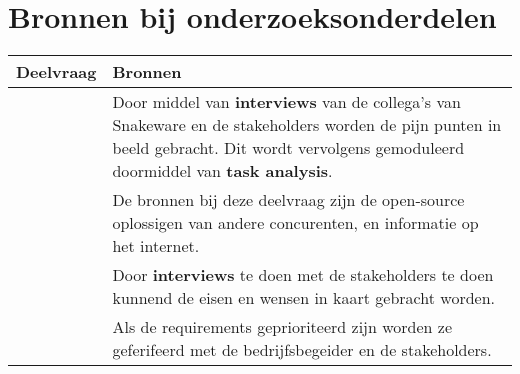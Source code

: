 \section{Bronnen bij onderzoeksonderdelen}
\begin{tabular}{ | p{5cm} | p{9cm} | }
	\hline
	\textbf{Deelvraag} & \textbf{Bronnen}                                                                                                                               \\
	\hline
	\SubquestionOne    & Door middel van \textbf{interviews} van de collega's van Snakeware en de stakeholders worden de pijn punten in beeld gebracht.
	Dit wordt vervolgens gemoduleerd doormiddel van \textbf{task analysis}. \\
	\hline
	\SubquestionTwo    & De bronnen bij deze deelvraag zijn de open-source oplossigen van andere concurenten, en informatie op het internet.                              \\
	\hline
	\SubquestionThree  & Door \textbf{interviews} te doen met de stakeholders te doen kunnend de eisen en wensen in kaart gebracht worden.                                                                                             \\
	\hline
	\SubquestionFour   & Als de requirements geprioriteerd zijn worden ze geferifeerd met de bedrijfsbegeider en de stakeholders.                            \\
	\hline
\end{tabular}
